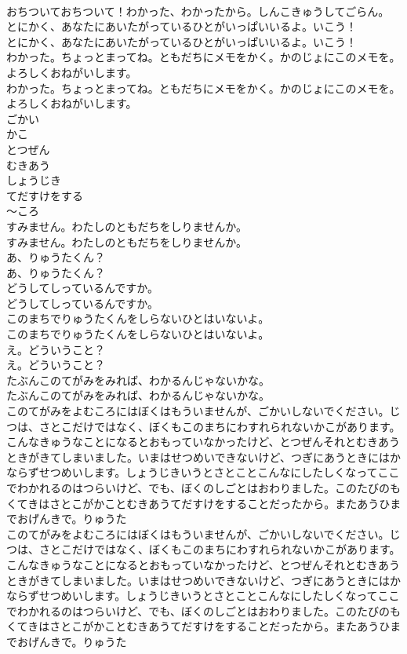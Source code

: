 \documentclass[8pt]{extreport}
\begin{document}
\begin{CJK}{UTF8}{min}
\\	おちついておちついて！わかった、わかったから。しんこきゅうしてごらん。
\\	とにかく、あなたにあいたがっているひとがいっぱいいるよ。いこう！
\\	とにかく、あなたにあいたがっているひとがいっぱいいるよ。いこう！
\\	わかった。ちょっとまってね。ともだちにメモをかく。かのじょにこのメモを。よろしくおねがいします。
\\	わかった。ちょっとまってね。ともだちにメモをかく。かのじょにこのメモを。よろしくおねがいします。
\\	ごかい
\\	かこ
\\	とつぜん
\\	むきあう
\\	しょうじき
\\	てだすけをする
\\	〜ころ
\\	すみません。わたしのともだちをしりませんか。
\\	すみません。わたしのともだちをしりませんか。
\\	あ、りゅうたくん？
\\	あ、りゅうたくん？
\\	どうしてしっているんですか。
\\	どうしてしっているんですか。
\\	このまちでりゅうたくんをしらないひとはいないよ。
\\	このまちでりゅうたくんをしらないひとはいないよ。
\\	え。どういうこと？
\\	え。どういうこと？
\\	たぶんこのてがみをみれば、わかるんじゃないかな。
\\	たぶんこのてがみをみれば、わかるんじゃないかな。
\\	このてがみをよむころにはぼくはもういませんが、ごかいしないでください。じつは、さとこだけではなく、ぼくもこのまちにわすれられないかこがあります。こんなきゅうなことになるとおもっていなかったけど、とつぜんそれとむきあうときがきてしまいました。いまはせつめいできないけど、つぎにあうときにはかならずせつめいします。しょうじきいうとさとことこんなにしたしくなってここでわかれるのはつらいけど、でも、ぼくのしごとはおわりました。このたびのもくてきはさとこがかことむきあうてだすけをすることだったから。またあうひまでおげんきで。りゅうた
\\	このてがみをよむころにはぼくはもういませんが、ごかいしないでください。じつは、さとこだけではなく、ぼくもこのまちにわすれられないかこがあります。こんなきゅうなことになるとおもっていなかったけど、とつぜんそれとむきあうときがきてしまいました。いまはせつめいできないけど、つぎにあうときにはかならずせつめいします。しょうじきいうとさとことこんなにしたしくなってここでわかれるのはつらいけど、でも、ぼくのしごとはおわりました。このたびのもくてきはさとこがかことむきあうてだすけをすることだったから。またあうひまでおげんきで。りゅうた

\end{CJK}
\end{document}
